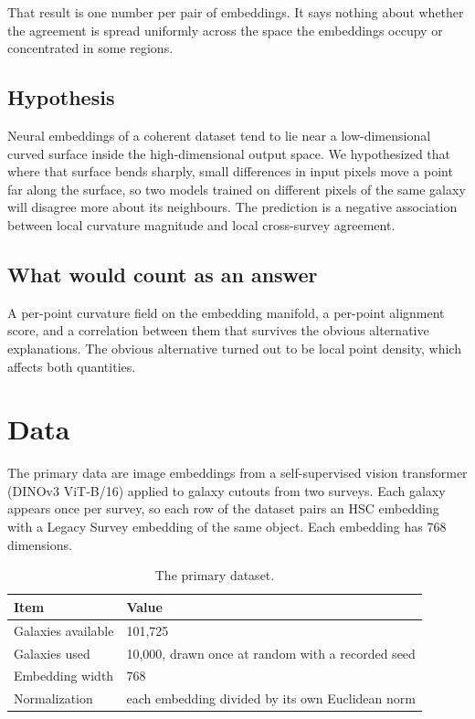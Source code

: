 \documentclass[11pt,a4paper]{article}
\begin{document}
That result is one number per pair of embeddings. It says nothing about whether the agreement is spread uniformly across the space the embeddings occupy or concentrated in some regions.

\subsection{Hypothesis}

Neural embeddings of a coherent dataset tend to lie near a low-dimensional curved surface inside the high-dimensional output space. We hypothesized that where that surface bends sharply, small differences in input pixels move a point far along the surface, so two models trained on different pixels of the same galaxy will disagree more about its neighbours. The prediction is a negative association between local curvature magnitude and local cross-survey agreement.

\subsection{What would count as an answer}

A per-point curvature field on the embedding manifold, a per-point alignment score, and a correlation between them that survives the obvious alternative explanations. The obvious alternative turned out to be local point density, which affects both quantities.

\section{Data}

The primary data are image embeddings from a self-supervised vision transformer (DINOv3 ViT-B/16) applied to galaxy cutouts from two surveys. Each galaxy appears once per survey, so each row of the dataset pairs an HSC embedding with a Legacy Survey embedding of the same object. Each embedding has 768 dimensions.

\begin{table}[h]
\centering
\begin{tabular}{ll}
\toprule
Item & Value \\
\midrule
Galaxies available & 101{,}725 \\
Galaxies used & 10{,}000, drawn once at random with a recorded seed \\
Embedding width & 768 \\
Normalization & each embedding divided by its own Euclidean norm \\
\bottomrule
\end{tabular}
\caption{The primary dataset.}
\end{table}
\end{document}
